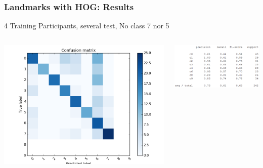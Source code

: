 \documentclass{beamer}
\begin{document}
	\begin{frame}
		\frametitle{Landmarks with HOG: Results}
		4 Training Participants, several test, No class 7 nor 5
		\begin{columns}
			\begin{column}{0.5\textwidth}
				\begin{center}
					\includegraphics[width=\textwidth]{mult_HOG/4c01234689matTest}\\			
				\end{center}
			\end{column}
			\begin{column}{0.5\textwidth}
				\begin{center}
					\includegraphics[width=\textwidth]{mult_HOG/4c01234689repTest}
				\end{center}
			\end{column}
		\end{columns}		
	\end{frame}	
	
\end{document}
